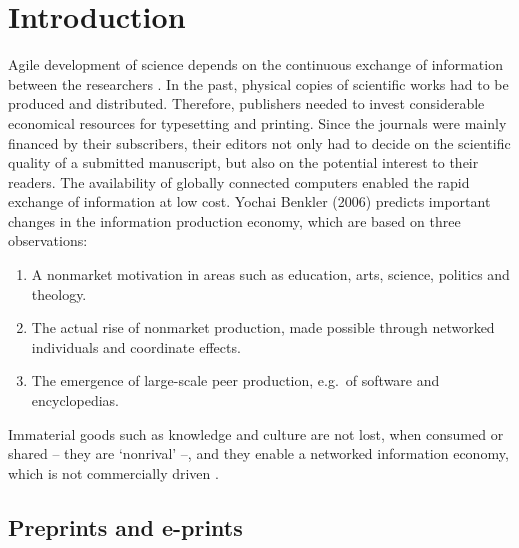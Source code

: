 \documentclass[10pt,fleqn]{wlpeerj}
\providecommand{\tightlist}{%
  \setlength{\itemsep}{0pt}\setlength{\parskip}{0pt}}
\begin{document}
\section{Introduction}\label{introduction}

Agile
development
of
science
depends
on
the
continuous
exchange
of
information
between
the
researchers
\citep{woelfle_open_2011}.
In
the
past,
physical
copies
of
scientific
works
had
to be
produced
and
distributed.
Therefore,
publishers
needed
to
invest
considerable
economical
resources
for
typesetting
and
printing.
Since
the
journals
were
mainly
financed
by
their
subscribers,
their
editors
not
only
had
to
decide
on
the
scientific
quality
of a
submitted
manuscript,
but
also
on
the
potential
interest
to
their
readers.
The
availability
of
globally
connected
computers
enabled
the
rapid
exchange
of
information
at
low
cost.
Yochai
Benkler
(2006)
predicts
important
changes
in
the
information
production
economy,
which
are
based
on
three
observations:

\begin{enumerate}
\def\labelenumi{\arabic{enumi}.}
\tightlist
\item
  A
  nonmarket
  motivation
  in
  areas
  such
  as
  education,
  arts,
  science,
  politics
  and
  theology.
\item
  The
  actual
  rise
  of
  nonmarket
  production,
  made
  possible
  through
  networked
  individuals
  and
  coordinate
  effects.
\item
  The
  emergence
  of
  large-scale
  peer
  production,
  e.g.~of
  software
  and
  encyclopedias.
\end{enumerate}

Immaterial
goods
such
as
knowledge
and
culture
are
not
lost,
when
consumed
or
shared
--
they
are
`nonrival'
--,
and
they
enable
a
networked
information
economy,
which
is
not
commercially
driven
\citep{benkler_wealth_2006}.

\subsection{Preprints
and
e-prints}\label{preprints-and-e-prints}
\end{document}
